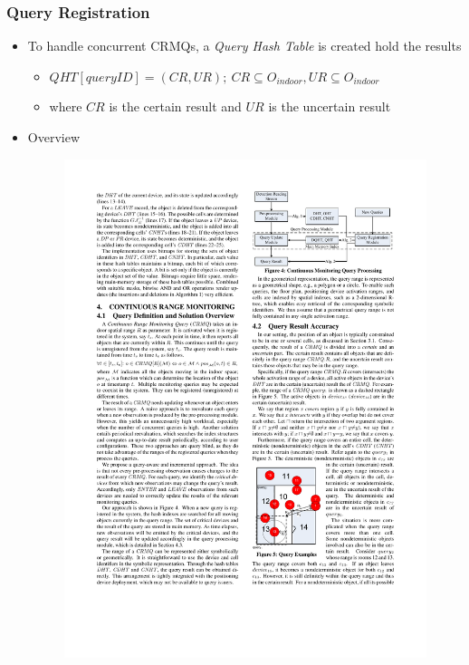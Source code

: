 \begin{frame}
\frametitle{Query Registration}

\begin{itemize}
  \item To handle concurrent \textrm{CRMQ}s, a \emph{Query Hash Table} is created hold the results
    \begin{itemize}
      \item $QHT[queryID] = (CR, UR);~ CR \subseteq O_{indoor}, UR \subseteq O_{indoor}$
      \item where $CR$ is the certain result and $UR$ is the uncertain result
    \end{itemize}
  \item Overview
    \begin{figure}[tb]
      \includegraphics[width=0.68\columnwidth]{figures/2-2/2-2-6.pdf}
    \end{figure}
\end{itemize}

\end{frame}


